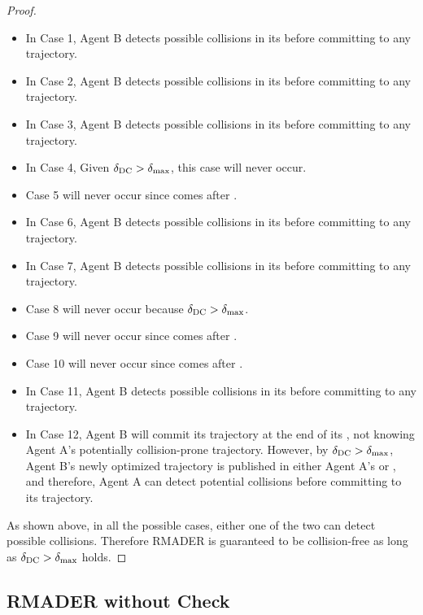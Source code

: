 \begin{proof}
\begin{itemize}
\item In Case 1, Agent B detects possible collisions in its \CStep{} before committing to any trajectory.
\item In Case 2, Agent B detects possible collisions in its \DCStep{} before committing to any trajectory.
\item In Case 3, Agent B detects possible collisions in its \DCStep{} before committing to any trajectory.
\item In Case 4, Given $\delta_\text{DC}{}>\delta_\text{max}{}$, this case will never occur.
\item Case 5 will never occur since \CStep{} comes after \OStep{}.
\item In Case 6, Agent B detects possible collisions in its \DCStep{} before committing to any trajectory.
\item In Case 7, Agent B detects possible collisions in its \DCStep{} before committing to any trajectory.
\item Case 8 will never occur because $\delta_\text{DC}{}>\delta_\text{max}{}$.
\item Case 9 will never occur since \DCStep{} comes after \OStep{}.
\item Case 10 will never occur since \DCStep{} comes after \CStep{}.
\item In Case 11, Agent B detects possible collisions in its \DCStep{} before committing to any trajectory.
\item In Case 12, Agent B will commit its trajectory at the end of its \DCStep{}, not knowing Agent A's potentially collision-prone trajectory. However, by $\delta_\text{DC}{}>\delta_\text{max}{}$, Agent B's newly optimized trajectory is published in either Agent A's \OStep{} or \CStep{}, and therefore, Agent A can detect potential collisions before committing to its trajectory.
\end{itemize}

As shown above, in all the possible cases, either one of the two can detect possible collisions. Therefore RMADER is guaranteed to be collision-free as long as $\delta_\text{DC}{}>\delta_\text{max}{}$ holds.
\end{proof}

\subsection{RMADER without Check}


